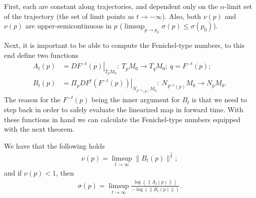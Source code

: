 \begin{remark}
 First, each are constant along trajectories, and dependent only on the $\alpha $-limit set of the trajectory (the set of limit points as $t \to -\infty $). Also, both $\nu(p)$ and $\nu(p) $ are upper-semicontinuous in $p$ ($\limsup_{p \to p_0} \sigma(p) \leq \sigma(p_0)$).
\end{remark}

Next, it is important to be able to compute the Fenichel-type numbers, to this end define two functions
\begin{align}
	A_{t}(p) &= \left. DF^{-t}(p) \right|_{T_{p}M_0}:\ T_{p}M_0 \to T_{q}M_0;\ q = F^{-t}(p); \\
	B_{t}(p) &= \left. \Pi_{p}DF^{t}(F^{-t}(p)) \right|_{N_{F^{-t}(p)}M_0}:\ N_{F^{-t}(p)}M_0 \to N_{p}M_0.
\end{align}
The reason for the $F^{-t}(p)$ being the inner argument for $B_{t}$ is that we need to step back in order to safely evaluate the linearized map in forward time. With these functions in hand we can calculate the Fenichel-type numbers equipped with the next theorem.

\begin{theorem}[Fenichel (1971)]
We have that the following holds
\begin{align}
	\boxed{\nu(p) = \limsup_{t\to \infty }\| B_{t}(p)\|^{\frac{1}{t}}; }
\end{align}
and if $\nu(p)<1$, then
\begin{align}
	\boxed{\sigma(p) = \limsup_{t\to \infty }\frac{\log\left( \| A_{t}(p) \| \right)}{-\log \left( \| B_{t}(p) \| \right)}.}
\end{align}
\end{theorem}

